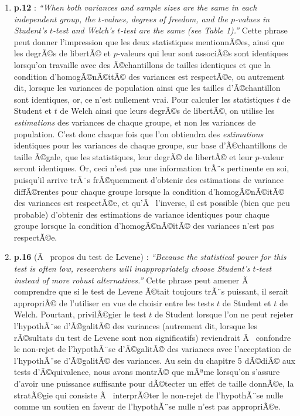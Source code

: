 \begin{appendix}
\begin{enumerate}
\def\labelenumi{\arabic{enumi})}
\item
  \textbf{p.12} : \emph{``When both variances and sample sizes are the
  same in each independent group, the \(t\)-values, degrees of freedom,
  and the \(p\)-values in Student's \(t\)-test and Welch's \(t\)-test
  are the same (see Table 1).''} Cette phrase peut donner l'impression
  que les deux statistiques mentionnÃ©es, ainsi que les degrÃ©s de
  libertÃ© et \(p\)-valeurs qui leur sont associÃ©s sont identiques
  lorsqu'on travaille avec des Ã©chantillons de tailles identiques et
  que la condition d'homogÃ©nÃ©itÃ© des variances est respectÃ©e, ou
  autrement dit, lorsque les variances de population ainsi que les
  tailles d'Ã©chantillon sont identiques, or, ce n'est nullement vrai.
  Pour calculer les statistiques \(t\) de Student et \(t\) de Welch
  ainsi que leurs degrÃ©s de libertÃ©, on utilise les \emph{estimations}
  des variances de chaque groupe, et non les variances de population.
  C'est donc chaque fois que l'on obtiendra des \emph{estimations}
  identiques pour les variances de chaque groupe, sur base
  d'Ã©chantillons de taille Ã©gale, que les statistiques, leur degrÃ© de
  libertÃ© et leur \(p\)-valeur seront identiques. Or, ceci n'est pas
  une information trÃ¨s pertinente en soi, puisqu'il arrive trÃ¨s
  frÃ©quemment d'obtenir des estimations de variance diffÃ©rentes pour
  chaque groupe lorsque la condition d'homogÃ©nÃ©itÃ© des variances est
  respectÃ©e, et qu'Ã~ l'inverse, il est possible (bien que peu
  probable) d'obtenir des estimations de variance identiques pour chaque
  groupe lorsque la condition d'homogÃ©nÃ©itÃ© des variances n'est pas
  respectÃ©e.
\item
  \textbf{p.16} (Ã~ propos du test de Levene) : \emph{``Because the
  statistical power for this test is often low, researchers will
  inappropriately choose Student's \(t\)-test instead of more robust
  alternatives.''} Cette phrase peut amener Ã~ comprendre que si le test
  de Levene Ã©tait toujours trÃ¨s puissant, il serait appropriÃ© de
  l'utiliser en vue de choisir entre les tests \(t\) de Student et \(t\)
  de Welch. Pourtant, privilÃ©gier le test \(t\) de Student lorsque l'on
  ne peut rejeter l'hypothÃ¨se d'Ã©galitÃ© des variances (autrement dit,
  lorsque les rÃ©sultats du test de Levene sont non significatifs)
  reviendrait Ã~ confondre le non-rejet de l'hypothÃ¨se d'Ã©galitÃ© des
  variances avec l'acceptation de l'hypothÃ¨se d'Ã©galitÃ© des
  variances. Au sein du chapitre 5 dÃ©diÃ© aux tests d'Ã©quivalence,
  nous avons montrÃ© que mÃªme lorsqu'on s'assure d'avoir une puissance
  suffisante pour dÃ©tecter un effet de taille donnÃ©e, la stratÃ©gie
  qui consiste Ã~ interprÃ©ter le non-rejet de l'hypothÃ¨se nulle comme
  un soutien en faveur de l'hypothÃ¨se nulle n'est pas appropriÃ©e.
\end{enumerate}


\end{appendix}

